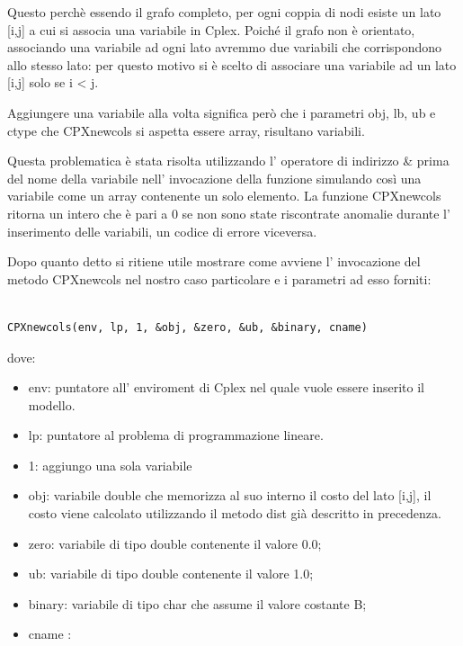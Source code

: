\documentclass[11pt]{article}
\begin{document}
Questo perch\`e essendo il grafo completo, per ogni coppia di nodi esiste un lato [i,j] a cui si associa una variabile in Cplex. Poich\'e il grafo non \`e orientato, associando una variabile ad ogni lato avremmo due variabili che corrispondono allo stesso lato: per questo motivo si \`e scelto di associare una variabile ad un lato [i,j] solo se i < j.

Aggiungere una variabile alla volta significa per\`o che i parametri obj, lb, ub e ctype che CPXnewcols si aspetta essere array, risultano variabili. 

Questa problematica \`e stata risolta utilizzando l' operatore di indirizzo \& prima del nome della variabile nell' invocazione della funzione simulando cos\`i una variabile come un array contenente un solo elemento. La funzione CPXnewcols ritorna un intero che \`e pari a 0 se non sono state riscontrate anomalie durante l' inserimento delle variabili, un codice di errore viceversa. 

Dopo quanto detto si ritiene utile mostrare come avviene l' invocazione del metodo CPXnewcols nel nostro caso particolare e i parametri ad esso forniti:

\begin{lstlisting}

CPXnewcols(env, lp, 1, &obj, &zero, &ub, &binary, cname)

\end{lstlisting}

dove:

\begin{itemize}
\item env: puntatore all' enviroment di Cplex nel quale vuole essere inserito il modello.
\item lp: puntatore al problema di programmazione lineare.
\item 1: aggiungo una sola variabile
\item obj: variabile double che memorizza al suo interno il costo del lato [i,j], il costo viene calcolato utilizzando il metodo dist gi\`a descritto in precedenza.
\item zero: variabile di tipo double contenente il valore  0.0;
\item ub: variabile di tipo double contenente il valore 1.0;
\item binary: variabile di tipo char che assume il valore costante B;
\item cname : 
\end{itemize}
\end{document}
